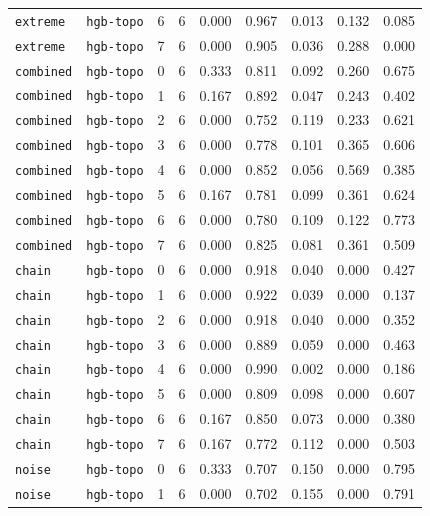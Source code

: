 \documentclass{article}
\begin{document}
\begin{center}
\begin{tabular}{lllcccccc}
\texttt{extreme} & \texttt{hgb-topo} & 6 & 6 & 0.000 & 0.967 & 0.013 & 0.132 & 0.085 \\
\texttt{extreme} & \texttt{hgb-topo} & 7 & 6 & 0.000 & 0.905 & 0.036 & 0.288 & 0.000 \\
\texttt{combined} & \texttt{hgb-topo} & 0 & 6 & 0.333 & 0.811 & 0.092 & 0.260 & 0.675 \\
\texttt{combined} & \texttt{hgb-topo} & 1 & 6 & 0.167 & 0.892 & 0.047 & 0.243 & 0.402 \\
\texttt{combined} & \texttt{hgb-topo} & 2 & 6 & 0.000 & 0.752 & 0.119 & 0.233 & 0.621 \\
\texttt{combined} & \texttt{hgb-topo} & 3 & 6 & 0.000 & 0.778 & 0.101 & 0.365 & 0.606 \\
\texttt{combined} & \texttt{hgb-topo} & 4 & 6 & 0.000 & 0.852 & 0.056 & 0.569 & 0.385 \\
\texttt{combined} & \texttt{hgb-topo} & 5 & 6 & 0.167 & 0.781 & 0.099 & 0.361 & 0.624 \\
\texttt{combined} & \texttt{hgb-topo} & 6 & 6 & 0.000 & 0.780 & 0.109 & 0.122 & 0.773 \\
\texttt{combined} & \texttt{hgb-topo} & 7 & 6 & 0.000 & 0.825 & 0.081 & 0.361 & 0.509 \\
\texttt{chain} & \texttt{hgb-topo} & 0 & 6 & 0.000 & 0.918 & 0.040 & 0.000 & 0.427 \\
\texttt{chain} & \texttt{hgb-topo} & 1 & 6 & 0.000 & 0.922 & 0.039 & 0.000 & 0.137 \\
\texttt{chain} & \texttt{hgb-topo} & 2 & 6 & 0.000 & 0.918 & 0.040 & 0.000 & 0.352 \\
\texttt{chain} & \texttt{hgb-topo} & 3 & 6 & 0.000 & 0.889 & 0.059 & 0.000 & 0.463 \\
\texttt{chain} & \texttt{hgb-topo} & 4 & 6 & 0.000 & 0.990 & 0.002 & 0.000 & 0.186 \\
\texttt{chain} & \texttt{hgb-topo} & 5 & 6 & 0.000 & 0.809 & 0.098 & 0.000 & 0.607 \\
\texttt{chain} & \texttt{hgb-topo} & 6 & 6 & 0.167 & 0.850 & 0.073 & 0.000 & 0.380 \\
\texttt{chain} & \texttt{hgb-topo} & 7 & 6 & 0.167 & 0.772 & 0.112 & 0.000 & 0.503 \\
\texttt{noise} & \texttt{hgb-topo} & 0 & 6 & 0.333 & 0.707 & 0.150 & 0.000 & 0.795 \\
\texttt{noise} & \texttt{hgb-topo} & 1 & 6 & 0.000 & 0.702 & 0.155 & 0.000 & 0.791 \\
\bottomrule
\end{tabular}
\end{center}
\end{document}
